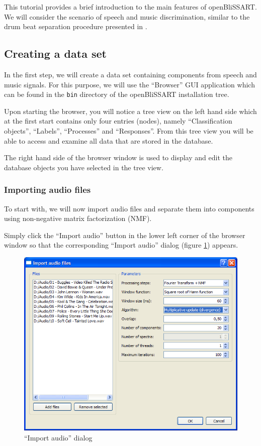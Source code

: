 %
%


This tutorial provides a brief introduction to the main features of
openBliSSART. We will consider the scenario of speech and music discrimination,
similar to the drum beat separation procedure presented in
\cite{Schuller2009}.


\subsection{Creating a data set}

In the first step, we will create a data set containing components from speech
and music signals. For this purpose, we will use the ``Browser'' GUI application
which can be found in the {\tt bin} directory of the openBliSSART installation
tree.

Upon starting the browser, you will notice a tree view on the left hand side
which at the first start contains only four entries (nodes), namely
``Classification objects'', ``Labels'', ``Processes'' and ``Responses''. From
this tree view you will be able to access and examine all data that are stored
in the database.

The right hand side of the browser window is used to display and edit the
database objects you have selected in the tree view.


\subsubsection{Importing audio files}

To start with, we will now import audio files and separate them into components
using non-negative matrix factorization (NMF).

Simply click the ``Import audio'' button in the lower left corner of the browser
window so that the corresponding ``Import audio'' dialog (figure
\ref{figure:TutorialImportAudio}) appears.

\begin{figure}
    \centering
    \includegraphics[width=\textwidth]{tutorial-media/ImportAudio.png}
    \caption{%
        \label{figure:TutorialImportAudio}%
        ``Import audio'' dialog
    }
\end{figure}

